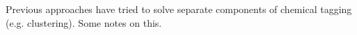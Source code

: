 \documentclass{aastex61}
\def\infinity{\rotatebox{90}{8}}
\begin{document}
\begin{comment}
\begin{enumerate}
  \item There are missing data.
        Given high-resolution spectra with signal-to-noise (S/N) ratios of
        $\infinity$, there will be chemical abundances where only an upper
        limit can be reported.
        For example, if there are no transitions in the spectra, or the
        chemical abundance is so low that there is no net absorption in the 
        photosphere, then there will be no observable effect in the data.
        Chemical tagging approaches must be able to accept `upper limits'\footnote{
          The use of the term `\emph{upper limit}' amongst spectroscopists is
          muddled. 
          Frequently an `upper limit' is reported that represents (near-)zero
          likelihood that the abundance could be above the quoted value.
          Alternatively, a reported `upper limit' might describe a 
          $\approx1\sigma$ (non-symmetric) limit estimated from the local
          noise in the data.
          Ideally a posterior distribution should to be provided.
        }
        reported by spectroscopists.
  \item The abundance measurements may be biased.
  \item If there are uncertainties provided for abundances, then those
        uncertainties are likely to be underestimated.
  \item The measurements will have heteroscedastic noise properties.
        In other words, the abundance uncertainties will differ between
        elements and stars.
  \item The measurements of individual chemical abundances may be correlated
        due to the way the abundance was measured.
        For example, if there is a single absorption line present in the
        spectrum for an element (e.g., \ion{O}{1}), and that absorption line
        is blended with a comparably strong transition from another element
        (e.g., \ion{Ni}{1}), then the measured abundances of \ion{O}{1} and
        \ion{Ni}{2} will be (positively) correlated.
        This correlation may be difficult to discern from an \emph{intrinsic}
        correlation between the two elements.
\end{enumerate}
\end{comment}




Previous approaches have tried to solve separate components of chemical tagging (e.g. clustering). Some notes on this.
\end{document}
